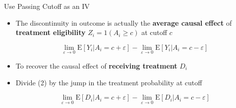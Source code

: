 \documentclass[dvipsnames,hyperref={pdfpagelabels=false}]{beamer}
\begin{document}
\begin{frame}{Use Passing Cutoff as an IV}{}
	\begin{itemize}
		
		\item The discontinuity in outcome is actually the \textbf{average causal effect} of \textbf{treatment eligibility} $Z_{i}=1(A_i\geq c)$ at cutoff $c$
		
		\begin{equation}
			\lim_{\varepsilon\rightarrow 0}\mathrm{E}[Y_{i}|A_{i}=c+\varepsilon]-\lim_{\varepsilon\rightarrow 0}\mathrm{E}[Y_{i}|A_{i}=c-\varepsilon]	
		\end{equation}
		
		
		\item To recover the causal effect of \textbf{receiving treatment} $D_{i}$
		\vspace{0.2cm}
		\item Divide (2) by the jump in the treatment probability at cutoff
		
		\begin{equation*}
			\lim_{\varepsilon\rightarrow 0}\mathrm{E}[D_{i}|A_{i}=c+\varepsilon]-\lim_{\varepsilon\rightarrow 0}\mathrm{E}[D_{i}|A_{i}=c-\varepsilon]
		\end{equation*}
		
	\end{itemize}
\end{frame}
\end{document}
